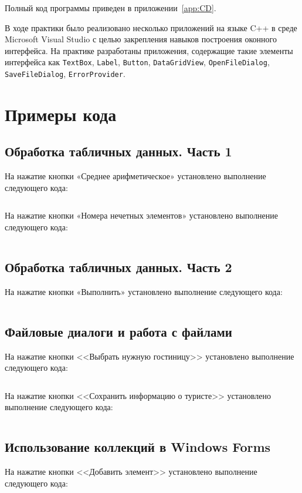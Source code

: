 \documentclass[bachelor, och, pract, times]{SCWorks}
\begin{document}
Полный код программы приведен в приложении~\ref{app:CD}.

\conclusion
В ходе практики было реализовано несколько приложений на языке C++ в среде Microsoft Visual Studio с целью закрепления навыков построения оконного интерфейса. На практике разработаны приложения, содержащие такие элементы интерфейса как \verb"TextBox", \verb"Label", \verb"Button", \verb"DataGridView", \linebreak \verb"OpenFileDialog", \verb"SaveFileDialog", \verb"ErrorProvider".

    
    
    
    \appendix
\section{Примеры кода}\label{app:code} 

\subsection*{Обработка табличных данных. Часть 1}

На нажатие кнопки «Среднее арифметическое» установлено выполнение следующего кода:
\inputminted[fontsize=\footnotesize]{cpp}{Код/Sred.cpp}

На нажатие кнопки «Номера нечетных элементов» установлено выполнение следующего кода:
\inputminted[fontsize=\footnotesize]{cpp}{Код/Nechet.cpp}

\subsection*{Обработка табличных данных. Часть 2}
На нажатие кнопки «Выполнить» установлено выполнение следующего кода:\inputminted[fontsize=\footnotesize]{cpp}{КодТаблица2/Execute.cpp}

\subsection*{Файловые диалоги и работа с файлами}
На нажатие кнопки <<Выбрать нужную гостиницу>> установлено выполнение следующего кода:
\inputminted[fontsize=\footnotesize]{cpp}{Файл/Ch.cpp}

На нажатие кнопки <<Сохранить информацию о туристе>> установлено выполнение следующего кода:
\inputminted[fontsize=\footnotesize]{cpp}{Файл/SaveChoice.cpp}

\subsection*{Использование коллекций в Windows Forms}
На нажатие кнопки <<Добавить элемент>> установлено выполнение следующего кода:
\inputminted[fontsize=\footnotesize]{cpp}{Колекции/Add.cpp}
\end{document}
